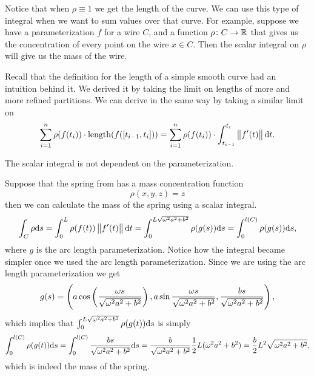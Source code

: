 \documentclass[11pt,a4paper]{article}
\begin{document}
\begin{remark}
  Notice that when $\rho \equiv 1$ we get the length of the curve.
  We can use this type of integral when we want to sum values over that
  curve.
  For example, suppose we have a parameterization $f$ for a wire $C$,
  and a function $\rho \colon C \to \mathbb{R}$ that gives us the concentration
  of every point on the wire $x \in C$.
  Then the scalar integral on $\rho$ will give us the mass of the wire.
\end{remark}

\begin{remark}
  Recall that the definition for the length of a simple smooth curve
  had an intuition behind it.
  We derived it by taking the limit on lengths of more and more refined
  partitions.
  We can derive  in the same way
  by taking a similar limit on
  \[
    \sum_{i=1}^{n} \rho(f(t_i)) \cdot \mathrm{length}(f([t_{i-1},t_i])) =
    \sum_{i=1}^{n} \rho(f(t_i)) \cdot \int_{t_{i-1}}^{t_i} \left\lVert f'(t)\right\rVert \mathrm{d} t.
  \]
\end{remark}

\begin{remark}
  The scalar integral is not dependent on the parameterization.
\end{remark}

\begin{example}
  Suppose that the spring from  has a
  mass concentration function
  \[
    \rho(x,y,z) = z
  \]
  then we can calculate the mass of the spring using a scalar integral.
  \[
    \int_{C} \rho \mathrm{d} s =
    \int_{0}^{L} \rho(f(t)) \left\lVert f'(t)\right\rVert \mathrm{d} t =
    \int_{0}^{L \sqrt{\omega^2 a^2 + b^2}} \rho(g(s)) \mathrm{d} s =
    \int_{0}^{l(C)} \rho(g(s)) \mathrm{d} s,
  \]
  where $g$ is the arc length parameterization.
  Notice how the integral became simpler once we used the arc
  length parameterization.
  Since we are using the arc length parameterization we get
  \[
  g(s) =
  \del{a \cos\del{\frac{\omega s}{\sqrt{\omega^2 a^2 + b^2}}},
  a \sin{\frac{\omega s}{\sqrt{\omega^2 a^2 + b^2}}},
  \frac{bs}{\sqrt{\omega^2 a^2 + b^2}}},
  \]
  which implies that $\int_{0}^{L \sqrt{\omega^2 a^2 + b^2}} \rho(g(t)) \mathrm{d} s$
  is simply
  \[
    \int_{0}^{l(C)} \rho(g(t)) \mathrm{d} s =
    \int_{0}^{l(C)} \frac{bs}{\sqrt{\omega^2 a^2 + b^2}} \mathrm{d} s =
    \frac{b}{\sqrt{\omega^2 a^2 + b^2}} \frac{1}{2} L (\omega^2 a^2 + b^2) =
    \frac{b}{2} L^2 \sqrt{\omega^2 a^2 + b^2},
  \]
  which is indeed the mass of the spring.
\end{example}
\end{document}
